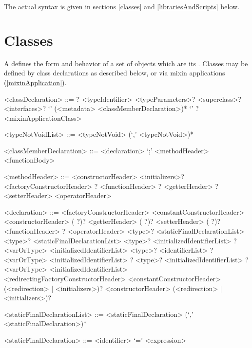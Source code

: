 \documentclass[makeidx]{article}
\begin{document}
\LMHash{}%
The actual syntax is given in
sections \ref{classes} and \ref{librariesAndScripts} below.


\section{Classes}

\LMHash{}%
A  defines the form and behavior of a set of objects which are its
.
Classes may be defined by class declarations as described below,
or via mixin applications (\ref{mixinApplication}).

\begin{grammar}
<classDeclaration> ::=
  \ABSTRACT? \CLASS{} <typeIdentifier> <typeParameters>?
  \gnewline{} <superclass>? <interfaces>?
  \gnewline{} `{' (<metadata> <classMemberDeclaration>)* `}'
  \alt \ABSTRACT? \CLASS{} <mixinApplicationClass>

<typeNotVoidList> ::= <typeNotVoid> (`,' <typeNotVoid>)*

<classMemberDeclaration> ::= <declaration> `;'
  \alt <methodHeader> <functionBody>

<methodHeader> ::= <constructorHeader> <initializers>?
  \alt <factoryConstructorHeader>
  \alt \STATIC? <functionHeader>
  \alt \STATIC? <getterHeader>
  \alt \STATIC? <setterHeader>
  \alt <operatorHeader>

<declaration> ::= \EXTERNAL{} <factoryConstructorHeader>
  \alt \EXTERNAL{} <constantConstructorHeader>
  \alt \EXTERNAL{} <constructorHeader>
  \alt (\EXTERNAL{} \STATIC?)? <getterHeader>
  \alt (\EXTERNAL{} \STATIC?)? <setterHeader>
  \alt (\EXTERNAL{} \STATIC?)? <functionHeader>
  \alt \EXTERNAL? <operatorHeader>
  \alt \STATIC{} \CONST{} <type>? <staticFinalDeclarationList>
  \alt \STATIC{} \FINAL{} <type>? <staticFinalDeclarationList>
  \alt \STATIC{} \LATE{} \FINAL{} <type>? <initializedIdentifierList>
  \alt \STATIC{} \LATE? <varOrType> <initializedIdentifierList>
  \alt \COVARIANT{} \LATE{} \FINAL{} <type>? <identifierList>
  \alt \COVARIANT{} \LATE? <varOrType> <initializedIdentifierList>
  \alt \LATE? \FINAL{} <type>? <initializedIdentifierList>
  \alt \LATE? <varOrType> <initializedIdentifierList>
  \alt <redirectingFactoryConstructorHeader>
  \alt <constantConstructorHeader> (<redirection> | <initializers>)?
  \alt <constructorHeader> (<redirection> | <initializers>)?

<staticFinalDeclarationList> ::= \gnewline{}
  <staticFinalDeclaration> (`,' <staticFinalDeclaration>)*

<staticFinalDeclaration> ::= <identifier> `=' <expression>
\end{grammar}
\end{document}
